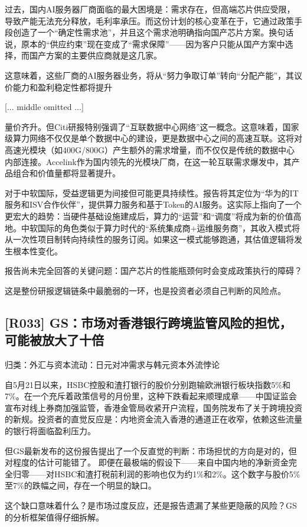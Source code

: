 \documentclass[11pt]{ctexart}
\begin{document}
过去，国内AI服务器厂商面临的最大困境是：需求存在，但高端芯片供应受限，导致产能无法充分释放，毛利率承压。而这份计划的核心变革在于，它通过政策手段创造了一个“确定性需求池”，并且这个需求池明确指向国产芯片方案。换句话说，原本的“供应约束”现在变成了“需求保障”——因为客户只能从国产方案中选择，而国产方案的主要供应商就是这几家。

这意味着，这些厂商的AI服务器业务，将从“努力争取订单”转向“分配产能”，其议价能力和盈利稳定性都将提升

[... middle omitted ...]

量价齐升。但Citi研报特别强调了“互联数据中心网络”这一概念。这意味着，国家级算力网络不仅仅是单个数据中心的建设，更是数据中心之间的高速互联。这将对高速光模块（如400G/800G）产生额外的需求增量，而不仅仅是传统的数据中心内部连接。Accelink作为国内领先的光模块厂商，在这一轮互联需求爆发中，其产品组合和价值量都将显著提升。

对于中软国际，受益逻辑更为间接但可能更具持续性。报告将其定位为“华为的IT服务和ISV合作伙伴”，提供算力服务和基于Token的AI服务。这实际上指向了一个更宏大的趋势：当硬件基础设施建成后，算力的“运营”和“调度”将成为新的价值高地。中软国际的角色类似于算力时代的“系统集成商+运维服务商”，其收入模式将从一次性项目制转向持续性的服务订阅。如果这一模式能够跑通，其估值逻辑将发生根本性变化。

报告尚未完全回答的关键问题：国产芯片的性能瓶颈何时会变成政策执行的障碍？

这是整份研报逻辑链条中最脆弱的一环，也是投资者必须自己判断的风险点。

\subsection{[R033] GS：市场对香港银行跨境监管风险的担忧，可能被放大了十倍}
{\small\color{refgray}归类：外汇与资本流动：日元对冲需求与韩元资本外流悖论}

自5月21日以来，HSBC控股和渣打银行的股价分别跑输欧洲银行板块指数5\%和7\%。在一个充斥着政策信号的月份里，这种下跌看起来顺理成章——中国证监会宣布对线上券商加强监管，香港金管局收紧开户流程，国务院发布了关于跨境投资的新规。投资者的直觉反应是：内地资金流入香港的通道正在收窄，依赖这些流量的银行将面临盈利压力。

但GS最新发布的这份报告提出了一个反直觉的判断：市场担忧的方向是对的，但对程度的估计可能错了。 即便在最极端的假设下——来自中国内地的净新资金完全归零——对HSBC和渣打税前利润的影响也仅为约1\%和2\%。这个数字与股价5\%至7\%的跌幅之间，存在一个明显的缺口。

这个缺口意味着什么？是市场过度反应，还是报告遗漏了某些更隐蔽的风险？GS的分析框架值得仔细拆解。
\end{document}
